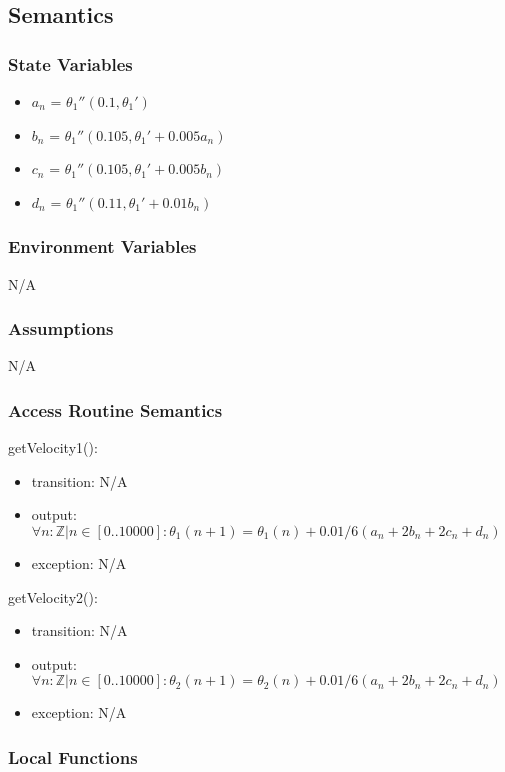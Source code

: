 \documentclass[12pt, titlepage]{article}
\begin{document}
\subsection{Semantics}

\subsubsection{State Variables}
\begin{itemize}
  \item $a_n$ = ${\theta_1}''(0.1,{\theta_1}')$ 
  \item $b_n$ = ${\theta_1}''(0.105,{\theta_1}'+0.005a_n)$
  \item $c_n$ = ${\theta_1}''(0.105,{\theta_1}'+0.005b_n)$
  \item $d_n$ = ${\theta_1}''(0.11,{\theta_1}'+0.01b_n)$

\end{itemize}
\subsubsection{Environment Variables}

N/A
\subsubsection{Assumptions}

N/A
\subsubsection{Access Routine Semantics}

\noindent getVelocity1():
\begin{itemize}
\item transition: N/A 
\item output: $\forall n: \mathbb{Z}| n \in[0..10000]: \theta_1(n+1) = \theta_1(n) + 0.01/6(a_n+2b_n+2c_n+d_n) $
\item exception: N/A
\end{itemize}

\noindent getVelocity2():
\begin{itemize}
\item transition: N/A 
\item output: $\forall n: \mathbb{Z}| n \in[0..10000]: \theta_2(n+1) = \theta_2(n) + 0.01/6(a_n+2b_n+2c_n+d_n) $
\item exception: N/A
\end{itemize}

\subsubsection{Local Functions}
\end{document}
